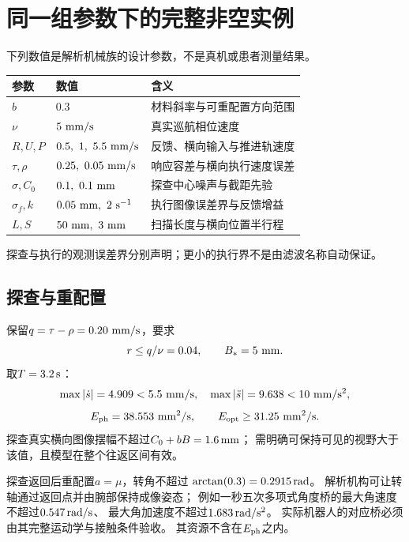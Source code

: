 \documentclass[11pt,a4paper]{article}
\numberwithin{equation}{section}
\theoremstyle{definition}
\begin{document}
\section{同一组参数下的完整非空实例}
下列数值是解析机械族的设计参数，不是真机或患者测量结果。
\begin{center}
\begin{tabularx}{\textwidth}{lYY}
\toprule
参数 & 数值 & 含义\\
\midrule
$b$ & $0.3$ & 材料斜率与可重配置方向范围\\
$\nu$ & $5\ {\rm mm/s}$ & 真实巡航相位速度\\
$R,U,P$ & $0.5,\ 1,\ 5.5\ {\rm mm/s}$ & 反馈、横向输入与推进轨速度\\
$\tau,\rho$ & $0.25,\ 0.05\ {\rm mm/s}$ & 响应容差与横向执行速度误差\\
$\sigma,C_0$ & $0.1,\ 0.1\ {\rm mm}$ & 探查中心噪声与截距先验\\
$\sigma_f,k$ & $0.05\ {\rm mm},\ 2\ {\rm s^{-1}}$ & 执行图像误差界与反馈增益\\
$L,S$ & $50\ {\rm mm},\ 3\ {\rm mm}$ & 扫描长度与横向位置半行程\\
\bottomrule
\end{tabularx}
\end{center}
探查与执行的观测误差界分别声明；更小的执行界不是由滤波名称自动保证。

\subsection{探查与重配置}
保留$q=\tau-\rho=0.20\ {\rm mm/s}$，要求
\[
 r\le q/\nu=0.04,\qquad B_*=5\ {\rm mm}.
\]
取$T=3.2\,{\rm s}$：
\[
 \max|\dot s|=4.909<5.5\ {\rm mm/s},\quad
 \max|\ddot s|=9.638<10\ {\rm mm/s^2},
\]
\[
 E_{\rm ph}=38.553\ {\rm mm^2/s},\qquad
 E_{\rm opt}\ge31.25\ {\rm mm^2/s}.
\]
探查真实横向图像摆幅不超过$C_0+bB=1.6\,{\rm mm}$；
需明确可保持可见的视野大于该值，且模型在整个往返区间有效。

探查返回后重配置$a=\mu$，转角不超过
$\arctan(0.3)=0.2915\,{\rm rad}$。
解析机构可让转轴通过返回点并由腕部保持成像姿态；
例如一秒五次多项式角度桥的最大角速度不超过$0.547\,{\rm rad/s}$、
最大角加速度不超过$1.683\,{\rm rad/s^2}$。
实际机器人的对应桥必须由其完整运动学与接触条件验收。
其资源不含在$E_{\rm ph}$之内。
\end{document}
